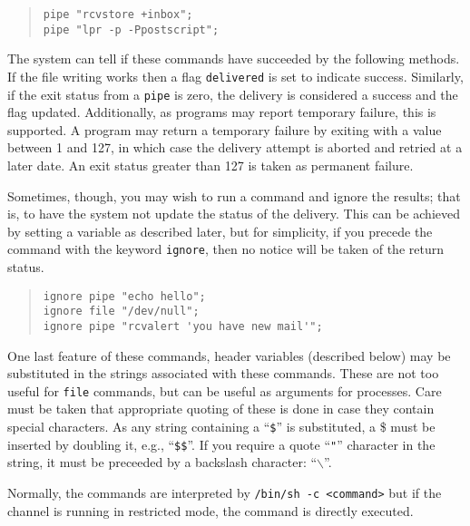 \begin{quote}\small\begin{verbatim}
pipe "rcvstore +inbox";
pipe "lpr -p -Ppostscript";
\end{verbatim}\end{quote}

The system can tell if these commands have succeeded by the following
methods.  If the file writing works then a flag
\verb|delivered| is set to indicate success.
Similarly, if the exit status from a \verb|pipe| is zero, the delivery
is considered a success and the flag updated.  Additionally, as
programs may report temporary failure, this is supported. A program
may return a temporary failure by exiting with a value between 1 and
127, in which case the delivery attempt is aborted and retried at a
later date. An exit status greater than 127 is taken as permanent failure.

Sometimes, though, you may wish to run a command and ignore the
results; that is, to have the system not update the status of the delivery.
This can be achieved by setting a variable as described later, but for
simplicity, if you precede the command with the keyword
\verb+ignore+, then no notice will be taken of the return
status.

\begin{quote}\small\begin{verbatim}
ignore pipe "echo hello";
ignore file "/dev/null";
ignore pipe "rcvalert 'you have new mail'";
\end{verbatim}\end{quote}

One last feature of these commands, header variables (described below)
may be substituted in the strings associated with these commands. These
are not too useful for \verb|file| commands, but can be useful as
arguments for processes. Care must be taken that appropriate quoting
of these is done in case they contain special characters. As any
string containing a ``\verb|$|'' is substituted, a \$ must be inserted
by doubling it, e.g., ``\verb|$$|''. If you require a
quote ``\verb|"|'' character in the string, it must be preceeded by a
backslash character: ``$\backslash$''.

Normally, the commands are interpreted by
\verb|/bin/sh -c <command>| but if the  channel is
running in restricted mode, the command is directly executed.

